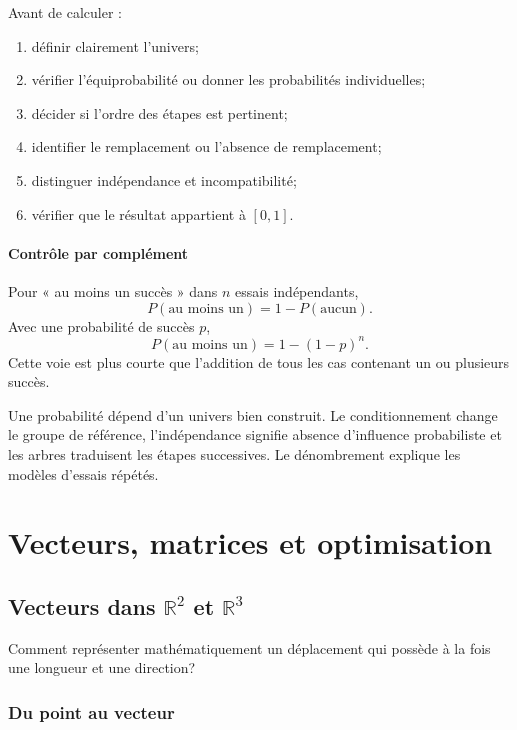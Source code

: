 \documentclass[12pt,a4paper,openany]{book}
\newcommand{\R}{\mathbb{R}}
\begin{document}
Avant de calculer :
\begin{enumerate}
\item définir clairement l'univers;
\item vérifier l'équiprobabilité ou donner les probabilités individuelles;
\item décider si l'ordre des étapes est pertinent;
\item identifier le remplacement ou l'absence de remplacement;
\item distinguer indépendance et incompatibilité;
\item vérifier que le résultat appartient à $[0,1]$.
\end{enumerate}

\subsection{Contrôle par complément}

Pour « au moins un succès » dans $n$ essais indépendants,
\[
P(\text{au moins un})=1-P(\text{aucun}).
\]
Avec une probabilité de succès $p$,
\[
P(\text{au moins un})=1-(1-p)^n.
\]
Cette voie est plus courte que l'addition de tous les cas contenant un ou plusieurs succès.

\begin{summarybox}
Une probabilité dépend d'un univers bien construit. Le conditionnement change le groupe de référence, l'indépendance signifie absence d'influence probabiliste et les arbres traduisent les étapes successives. Le dénombrement explique les modèles d'essais répétés.
\end{summarybox}


\part{Vecteurs, matrices et optimisation}

\chapter{Vecteurs dans \texorpdfstring{$\R^2$ et $\R^3$}{R2 et R3}}

\begin{questionbox}
Comment représenter mathématiquement un déplacement qui possède à la fois une longueur et une direction?
\end{questionbox}

\section{Du point au vecteur}
\end{document}

